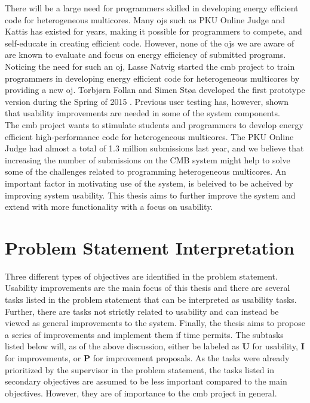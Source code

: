 There will be a large need for programmers skilled in developing energy efficient code for heterogeneous multicores. Many \glspl{oj} such as PKU Online Judge \cite{PKU} and Kattis \cite{KATTIS} has existed for years, making it possible for programmers to compete, and self-educate in creating efficient code. However, none of the \glspl{oj} we are aware of are known to evaluate and focus on energy efficiency of submitted programs. Noticing the need for such an \gls{oj}, Lasse Natvig started the \gls{cmb} project to train programmers in developing energy efficient code for heterogeneous multicores by providing a new \gls{oj}. Torbjørn Follan and Simen Støa developed the first prototype version during the Spring of 2015 \cite{mt:T&S}. Previous user testing has, however, shown that usability improvements are needed in some of the system components. \\

The \gls{cmb} project wants to stimulate students and programmers to develop energy efficient high-performance code for heterogeneous multicores. The PKU Online Judge \cite{PKU} had almost a total of 1.3 million submissions last year, and we believe that increasing the number of submissions on the CMB system might help to solve some of the challenges related to programming heterogeneous multicores. An important factor in motivating use of the system, is beleived to be acheived by improving system usability. This thesis aims to further improve the system and extend with more functionality with a focus on usability. \\

\section{Problem Statement Interpretation}
\label{sec:ps-inter}
Three different types of objectives are identified in the problem statement. Usability improvements are the main focus of this thesis and there are several tasks listed in the problem statement that can be interpreted as usability tasks. Further, there are tasks not strictly related to usability and can instead be viewed as general improvements to the system. Finally, the thesis aims to propose a series of improvements and implement them if time permits. The subtasks listed below will, as of the above discussion, either be labeled as \textbf{U} for usability, \textbf{I} for improvements, or \textbf{P} for improvement proposals. As the tasks were already prioritized by the supervisor in the problem statement, the tasks listed in secondary objectives are assumed to be less important compared to the main objectives. However, they are of importance to the \gls{cmb} project in general.

